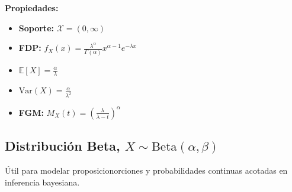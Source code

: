 \vspace{0.8em}
\noindent
\begin{minipage}[c]{0.45\textwidth}
    \textbf{Propiedades:}
    \begin{itemize}\setlength\itemsep{0.3em}
        \item \textbf{Soporte:} $\mathcal{X} = (0, \infty)$
        \item \textbf{FDP:} $f_X(x) = \frac{\lambda^\alpha}{\Gamma(\alpha)} x^{\alpha-1} e^{-\lambda x}$
        \item $\mathbb{E}[X] = \frac{\alpha}{\lambda}$
        \item $\text{Var}(X) = \frac{\alpha}{\lambda^2}$
        \item \textbf{FGM:} $M_X(t) = \left(\frac{\lambda}{\lambda - t}\right)^\alpha$
    \end{itemize}
\end{minipage}%
\hfill
\begin{minipage}[c]{0.5\textwidth}
    \begin{center}
    \end{center}
\end{minipage}

\subsection*{Distribución Beta, $X \sim \text{Beta}(\alpha, \beta)$}
Útil para modelar proposicionorciones y probabilidades continuas acotadas en inferencia bayesiana.

